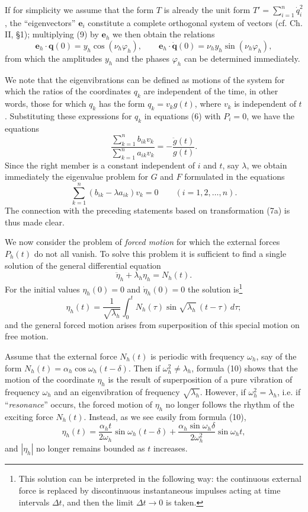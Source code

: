 If for simplicity we assume that the form $T$ is already the unit form $T'=\sum_{i=1}^n\dot q_i^2$, the ``eigenvectors'' $\mathbf e_i$ constitute a complete orthogonal system of vectors (cf. Ch. II, \S1); multiplying (9) by $\mathbf e_h$ we then obtain the relations
\[
\mathbf e_h\cdot\mathbf q(0)=y_h\cos(\nu_h\varphi_h),
\qquad
\mathbf e_h\cdot\dot{\mathbf q}(0)=\nu_hy_h\sin(\nu_h\varphi_h),
\]
from which the amplitudes $y_h$ and the phases $\varphi_h$ can be determined immediately.

We note that the eigenvibrations can be defined as motions of the system for which the ratios of the coordinates $q_k$ are independent of the time, in other words, those for which $q_k$ has the form $q_k=v_kg(t)$, where $v_k$ is independent of $t$. Substituting these expressions for $q_k$ in equations (6) with $P_i=0$, we have the equations
\[
\frac{\sum_{k=1}^n b_{ik}v_k}{\sum_{k=1}^n a_{ik}v_k}=-\frac{\ddot g(t)}{g(t)}.
\]
Since the right member is a constant independent of $i$ and $t$, say $\lambda$, we obtain immediately the eigenvalue problem for $G$ and $F$ formulated in the equations
\[
\sum_{k=1}^n(b_{ik}-\lambda a_{ik})v_k=0\qquad(i=1,2,\ldots,n).
\]
The connection with the preceding statements based on transformation (7a) is thus made clear.

We now consider the problem of \emph{forced motion} for which the external forces $P_h(t)$ do not all vanish. To solve this problem it is sufficient to find a single solution of the general differential equation
\[
\ddot\eta_h+\lambda_h\eta_h=N_h(t).
\]
For the initial values $\eta_h(0)=0$ and $\dot\eta_h(0)=0$ the solution is\footnote{This solution can be interpreted in the following way: the continuous external force is replaced by discontinuous instantaneous impulses acting at time intervals $\Delta t$, and then the limit $\Delta t\to0$ is taken.}
\begin{equation}\tag{10}
\eta_h(t)=\frac1{\sqrt{\lambda_h}}\int_0^tN_h(\tau)\sin\sqrt{\lambda_h}\,(t-\tau)\,d\tau;
\end{equation}
and the general forced motion arises from superposition of this special motion on free motion.

Assume that the external force $N_h(t)$ is periodic with frequency $\omega_h$, say of the form $N_h(t)=\alpha_h\cos\omega_h(t-\delta)$. Then if $\omega_h^2\ne\lambda_h$, formula (10) shows that the motion of the coordinate $\eta_h$ is the result of superposition of a pure vibration of frequency $\omega_h$ and an eigenvibration of frequency $\sqrt{\lambda_h}$. However, if $\omega_h^2=\lambda_h$, i.e. if ``\emph{resonance}'' occurs, the forced motion of $\eta_h$ no longer follows the rhythm of the exciting force $N_h(t)$. Instead, as we see easily from formula (10),
\[
\eta_h(t)=\frac{\alpha_ht}{2\omega_h}\sin\omega_h(t-\delta)
+\frac{\alpha_h\sin\omega_h\delta}{2\omega_h^2}\sin\omega_ht,
\]
and $|\eta_h|$ no longer remains bounded as $t$ increases.

